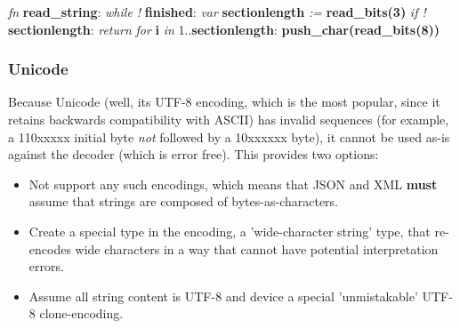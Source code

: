 \begin{changemargin}{-60mm}{0mm}
\begin{myquote}

\vbox{
\textit{fn} \textbf{read\_string}: \newline
\indent\hspace{.5cm} \textit{while !} \textbf{finished}: \newline
\indent\hspace{1cm} \textit{var} \textbf{sectionlength} \textit{:=} \textbf{read\_bits(3)} \newline
\indent\hspace{1cm} \textit{if !} \textbf{sectionlength}: \newline
\indent\hspace{1.5cm} \textit{return} \newline
\indent\hspace{1cm} \textit{for} \textbf{i} \textit{in} 1..\textbf{sectionlength}: \newline
\indent\hspace{1.5cm} \textbf{push\_char(read\_bits(8))} \newline
}

\end{myquote}
\end{changemargin}

\subsubsection{Unicode}

Because Unicode (well, its UTF-8 encoding, which is the most popular, since
it retains backwards compatibility with ASCII) has invalid sequences
(for example, a 110xxxxx initial byte \textit{not} followed by a
10xxxxxx byte), it cannot be used as-is against the decoder (which is error
free). This provides two options:

\begin{itemize}
\item Not support any such encodings, which means that JSON and XML
      \textbf{must} assume that strings are composed of bytes-as-characters.
\item Create a special type in the encoding, a 'wide-character string' type,
      that re-encodes wide characters in a way that cannot have
      potential interpretation errors.
\item Assume all string content is UTF-8 and device a special
      'unmistakable' UTF-8 clone-encoding.
\end{itemize}


